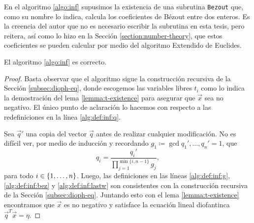 En el algoritmo \ref{algo:inf} supusimos la existencia de una subrutina \texttt{Bezout} que, como su
nombre lo indica, calcula los coeficientes de Bézout entre dos enteros. Es la creencia del autor
que no es necesario escribir la subrutina en esta tesis, pero reitera, así como lo hizo en la Sección
\ref{section:number-theory}, que estos coeficientes se pueden calcular por medio del algoritmo
Extendido de Euclides.

\begin{lemma}
	\label{lemma:alg:inf:correct}
	El algoritmo \ref{algo:inf} es correcto.
\end{lemma}
\begin{proof}
	Basta observar que el algoritmo sigue la construcción recursiva de la Sección
	\ref{subsec:dioph-eq}, donde escogemos las variables libres $t_i$ como lo indica la demostración
	del lema \ref{lemma:t-existence} para asegurar que $\vec{x}$ sea no negativo. El único punto de
	aclaración lo hacemos con respecto a las redefiniciones en la línea \ref{alg:def:inf:q}.

	Sea $\vec{q}'$ una copia del vector $\vec{q}$ antes de realizar cualquier modificación. No es
	difícil ver, por medio de inducción y recordando $g_1 \coloneq \gcd{q_1', \ldots, q_n'} = 1$,
	que
	\begin{equation*}
		q_i = \frac{q_i'}{\prod_{j=1}^{\min\lbrace i, n - 1\rbrace}g_j},
	\end{equation*}
	para todo $i \in \lbrace 1, \ldots, n \rbrace$. Luego, las definiciones en las líneas
	\eqref{alg:def:inf:g}, \eqref{alg:def:inf:bez} y \eqref{alg:def:inf:lastw} son consistentes con
	la construcción recursiva de la Sección \ref{subsec:dioph-eq}. Juntando esto con el lema
	\ref{lemma:t-existence} encontramos que $\vec{x}$ es no negativo y satisface la ecuación lineal
	diofantinca $\vec{q}^T\vec{x} = \eta$.




\end{proof}
